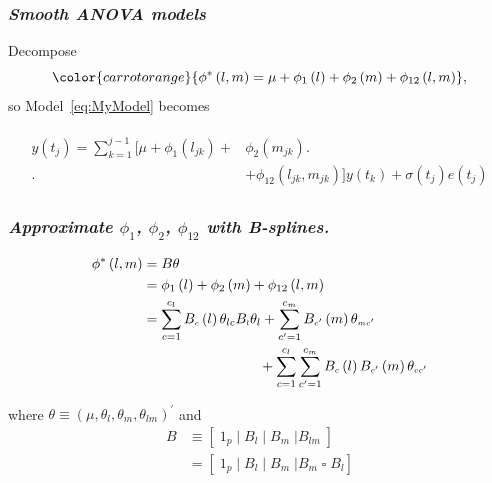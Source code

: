 \documentclass[12pt]{beamer}
\newcommand{\carrotorangemath}[1]{{ \color{carrotorange} {#1}}}
\newcommand{\ms}{\scriptscriptstyle}
\begin{document}
\begin{frame}
\frametitle{\emph{Smooth ANOVA models}}
Decompose
\begin{equation} \label{eq:SANOVA-model}
\carrotorangemath{
\phi^*\left(l,m\right) = \mu + \phi_1\left(l\right) + \phi_2\left(m\right) + \phi_{12}\left(l,m\right)},
\end{equation} 
so Model~\ref{eq:MyModel} becomes

\begin{align*}  
\begin{split}%
 y\left(t_j \right)  = \sum_{k=1}^{j-1} \bigg[\mu + \phi_1\left(l_{jk}\right) +  &\phi_2\left(m_{jk}\right) \bigg.\\[-2ex]
\bigg. &+ \phi_{12}\left(l_{jk},m_{jk}\right) \bigg]y\left(t_k\right)+ \sigma\left(t_j\right)e\left({t_j}\right)
\end{split}
\end{align*}
\end{frame}


\begin{frame}
\frametitle{\emph{Approximate $\phi_1$, $\phi_2$, $\phi_{12}$ with B-splines.}}

\begin{align}  
\begin{split}\label{eq:l-m-marginal-basis}
\phi^*\left(l,m \right) &= B \theta \\
&= \phi_1\left(l\right)  + \phi_2\left(m\right)  + \phi_{12}\left(l,m\right)  \\
&= \sum_{c=1}^{c_l} B_{\ms c}\left(l\right) \theta_{lc }  B_{\ms l} \theta_l + \sum_{c^\prime=1}^{c_m} B_{\ms{c^\prime}}  \left(  m \right)  \theta_{\ms{mc^\prime }}  \\
&\mbox{\;\;\;\;\;\;\;\;\;\;\;\;\;\;\;\;\;\;\;\;\;\;\;\;\;\;\;\;\;\;} + \sum_{c=1}^{c_l} \sum_{{c^\prime}=1}^{c_m} B_{\ms c}\left(l\right) B_{\ms{c^\prime } }\left(m\right)\theta_{\ms{c c^\prime} } 
\end{split}
\end{align}

where $\theta \equiv \left(\mu, \theta_{\ms{l}},\theta_{\ms{m}},\theta_{\ms{lm}}\right)^\prime $ and
\begin{align*}
B &\equiv \left[\; 1_p \; \vert \;  B_l  \; \vert \;   B_m \; \vert B_{\ms{lm}} \; \right] \\
&= \left[\; 1_p \; \vert \;  B_l  \; \vert \;   B_m \; \vert  B_m \; \square \; B_l \right] 
\end{align*}

\end{frame}
\end{document}
